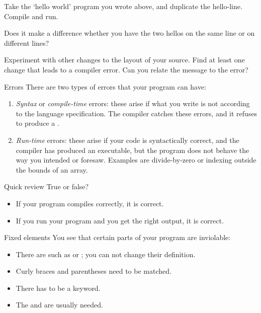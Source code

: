 \begin{exercise}
  \label{ex:hello-line}
  Take the `hello world' program you wrote above, and duplicate the
  hello-line. Compile and run.

  Does it make a difference whether you have the two hellos on the
  same line or on different lines?

  Experiment with other changes to the layout of your source. Find at
  least one change that leads to a compiler error. Can you relate the
  message to the error?
\end{exercise}

\begin{block}{Errors}
  \label{sl:program-errors}
  There are two types of errors that your program can have:
  \begin{enumerate}
  \item \emph{Syntax} or
    \emph{compile-time} errors: these arise
    if what you write is not according to the language specification.
    The compiler catches these errors, and it refuses to produce a
    .
  \item \emph{Run-time} errors: these arise if
    your code is syntactically correct, and the compiler has produced
    an executable, but the program does not behave the way you
    intended or foresaw. Examples are divide-by-zero or indexing
    outside the bounds of an array.
  \end{enumerate}
\end{block}

\begin{exercise}{Quick review}
  True or false?
  \begin{itemize}
  \item If your program compiles correctly, it is correct.
  \item If you run your program and you get the right output, it is correct.
  \end{itemize}  
\end{exercise}

\begin{block}{Fixed elements}
  \label{sl:fixedstuff}
  You see that certain parts of your program are inviolable:
  \begin{itemize}
  \item There are  such as  or ; you
    can not change their definition.
  \item Curly braces and parentheses need to be matched.
  \item There has to be a  keyword.
  \item The  and  are usually needed.
  \end{itemize}
\end{block}

